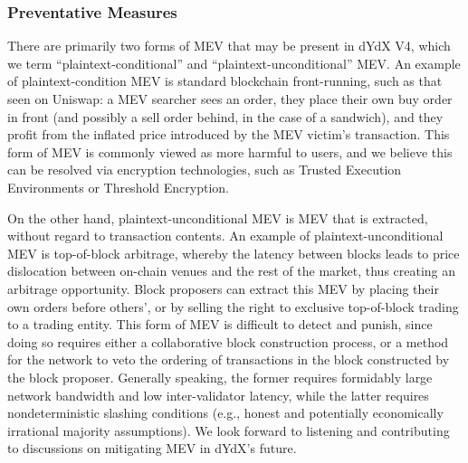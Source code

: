         \subsubsection{Preventative Measures}

            There are primarily two forms of MEV that may be present in dYdX V4, which we term ``plaintext-conditional''  and ``plaintext-unconditional'' MEV. An example of plaintext-condition MEV is standard blockchain front-running, such as that seen on Uniswap: a  MEV searcher sees an order, they place their own buy order in front (and possibly a sell order behind, in the case of a sandwich), and they profit from the inflated price introduced by the MEV victim's transaction. This form of MEV is commonly viewed as more harmful to users, and we believe this can be resolved via encryption technologies, such as Trusted Execution Environments or Threshold Encryption.

            On the other hand, plaintext-unconditional MEV is MEV that is extracted, without regard to transaction contents. An example of plaintext-unconditional MEV is top-of-block arbitrage, whereby the latency between blocks leads to price dislocation between on-chain venues and the rest of the market, thus creating an arbitrage opportunity. Block proposers can extract this MEV by placing their own orders before others', or by selling the right to exclusive top-of-block trading to a trading entity. This form of MEV is difficult to detect and punish, since doing so requires either a collaborative block construction process, or a method for the network to veto the ordering of transactions in the block constructed by the block proposer. Generally speaking, the former requires formidably large network bandwidth and low inter-validator latency, while the latter requires nondeterministic slashing conditions (e.g., honest and potentially economically irrational majority assumptions). We look forward to listening and contributing to discussions on mitigating MEV in dYdX's future.

